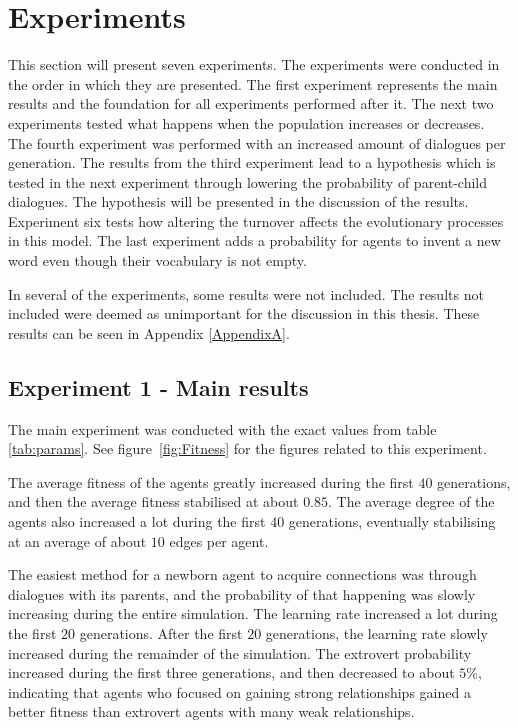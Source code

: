 \section{Experiments}
This section will present seven experiments. The experiments were conducted in the order in which they are presented. The first experiment represents the main results and the foundation for all experiments performed after it. The next two experiments tested what happens when the population increases or decreases. The fourth experiment was performed with an increased amount of dialogues per generation. The results from the third experiment lead to a hypothesis which is tested in the next experiment through lowering the probability of parent-child dialogues. The hypothesis will be presented in the discussion of the results. Experiment six tests how altering the turnover affects the evolutionary processes in this model. The last experiment adds a probability for agents to invent a new word even though their vocabulary is not empty.

In several of the experiments, some results were not included. The results not included were deemed as unimportant for the discussion in this thesis. These results can be seen in Appendix \ref{AppendixA}.

\subsection{Experiment 1 - Main results}
The main experiment was conducted with the exact values from table \ref{tab:params}. See figure~\ref{fig:Fitness} for the figures related to this experiment.

The average fitness of the agents greatly increased during the first $40$ generations, and then the average fitness stabilised at about $0.85$. The average degree of the agents also increased a lot during the first $40$ generations, eventually stabilising at an average of about $10$ edges per agent. 

The easiest method for a newborn agent to acquire connections was through dialogues with its parents, and the probability of that happening was slowly increasing during the entire simulation. The learning rate increased a lot during the first $20$ generations. After the first $20$ generations, the learning rate slowly increased during the remainder of the simulation. The extrovert probability increased during the first three generations, and then decreased to about $5\%$, indicating that agents who focused on gaining strong relationships gained a better fitness than extrovert agents with many weak relationships. 

